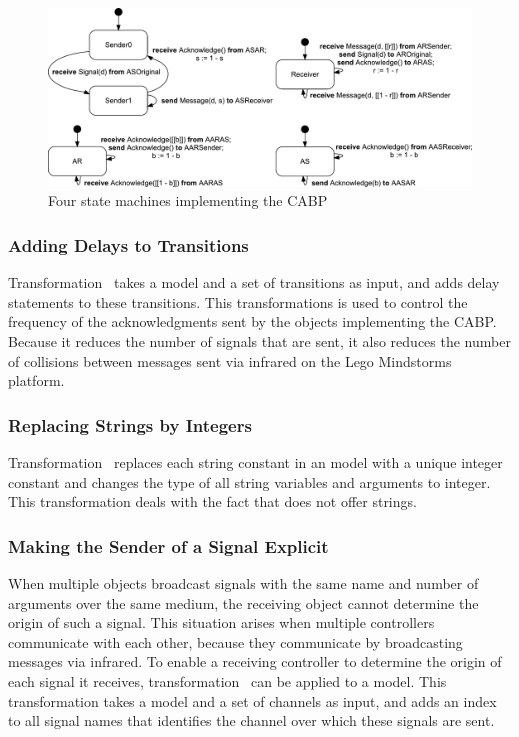 \begin{figure}[hbt]
  \centering
  \includegraphics[scale=0.45]{slco/figs/transformations/ABP}
  \caption{Four state machines implementing the CABP}
  \label{fig:slco:cabp}
\end{figure}

\subsubsection{Adding Delays to Transitions}
Transformation~ takes a model and a set of transitions as input, and adds delay statements to these transitions.
This transformations is used to control the frequency of the acknowledgments sent by the objects implementing the CABP.
Because it reduces the number of signals that are sent, it also reduces the number of collisions between messages sent via infrared on the Lego Mindstorms platform.


\subsubsection{Replacing Strings by Integers}
Transformation~ replaces each string constant in an \SLCO model with a unique integer constant and changes the type of all string variables and arguments to integer.
This transformation deals with the fact that \NQC does not offer strings.

\subsubsection{Making the Sender of a Signal Explicit}
When multiple objects broadcast signals with the same name and number of arguments over the same medium, the receiving object cannot determine the origin of such a signal.
This situation arises when multiple \RCX controllers communicate with each other, because they communicate by broadcasting messages via infrared.
To enable a receiving controller to determine the origin of each signal it receives, transformation~ can be applied to a model.
This transformation takes a model and a set of channels as input, and adds an index to all signal names that identifies the channel over which these signals are sent.


